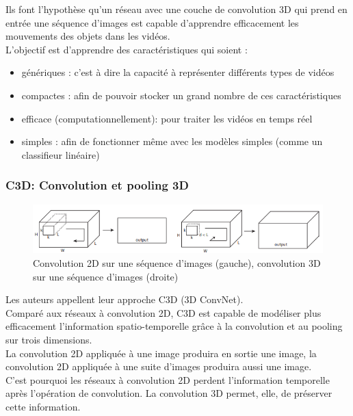 \documentclass[11pt]{article}
\begin{document}
Ils font l'hypothèse qu'un réseau avec une couche de convolution 3D qui prend en entrée une séquence d'images est capable d'apprendre efficacement les mouvements des objets dans les vidéos.\\

L'objectif est d'apprendre des caractéristiques qui soient :\\
\begin{itemize}
\item génériques : c'est à dire la capacité à représenter différents types de vidéos\\
\item compactes : afin de pouvoir stocker un grand nombre de ces caractéristiques\\
\item efficace (computationnellement): pour traiter les vidéos en temps réel\\
\item simples : afin de fonctionner même avec les modèles simples (comme un classifieur linéaire)\\
\end{itemize}

\subsubsection{C3D: Convolution et pooling 3D}
\label{sec:org8e146d1}
\begin{figure}[htbp]
\centering
\includegraphics[width=.9\linewidth]{c3d_idea.png}
\caption{Convolution 2D sur une séquence d'images (gauche), convolution 3D sur une séquence d'images (droite) \label{c3d-idea}}
\end{figure}
Les auteurs appellent leur approche C3D (3D ConvNet).\\
Comparé aux réseaux à convolution 2D, C3D est capable de modéliser plus efficacement l'information spatio-temporelle grâce à la convolution et au pooling sur trois dimensions.\\
La convolution 2D appliquée à une image produira en sortie une image, la convolution 2D appliquée à une suite d'images produira aussi une image.\\
C'est pourquoi les réseaux à convolution 2D perdent l'information temporelle après l'opération de convolution. La convolution 3D permet, elle, de préserver cette information.\\
\end{document}
